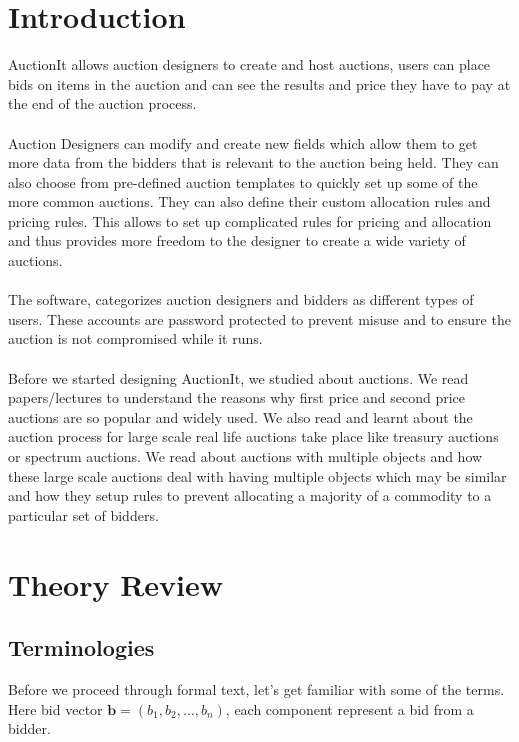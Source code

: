 \documentclass[a4paper]{article}
\begin{document}
\section*{Introduction}
AuctionIt allows auction designers to create and host auctions, users can place bids on items in the auction and can see the results and price they have to pay at the end of the auction process.
\\\\ Auction Designers can modify and create new fields which allow them to get more data from the bidders that is relevant to the auction being held. They can also choose from pre-defined auction templates to quickly set up some of the more common auctions. They can also define their custom allocation rules and pricing rules. This allows to set up complicated rules for pricing and allocation and thus provides more freedom to the designer to create a wide variety of auctions. 
\\\\
The software, categorizes auction designers and bidders as different types of users. These accounts are password protected to prevent misuse and to ensure the auction is not compromised while it runs.
\\\\
Before we started designing AuctionIt, we studied about auctions. We read papers/lectures to understand the reasons why first price and second price auctions are so popular and widely used. We also read and learnt about the auction process for large scale real life auctions take place like treasury auctions or spectrum auctions. We read about auctions with multiple objects and how these large scale auctions deal with having multiple objects which may be similar and how they setup rules to prevent allocating a majority of a commodity to a particular set of bidders.

\pagebreak
\section*{Theory Review}
\subsection*{Terminologies}
Before we proceed through formal text, let's get familiar with some of the terms.
Here bid vector $\mathbf{b} = (b_1, b_2,\ldots,b_n)$, each component represent a bid from a bidder.
\end{document}
